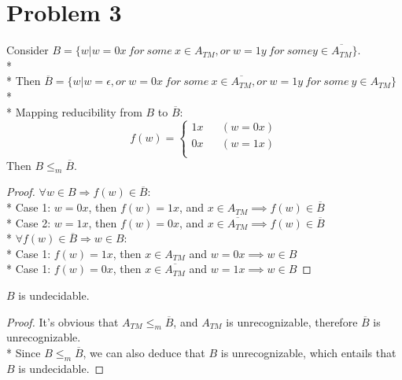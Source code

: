 \documentclass{article}
\begin{document}
    \section*{Problem 3}
    Consider $B=\{w|w=0x\ for\ some\ x \in A_{TM}, or\ w=1y\ for\ some y \in \overline{A_{TM}}\}$.\\*\\*
    Then $\overline{B}=\{ w|w=\epsilon,or\ w=0x\ for\ some\ x \in \overline{A_{TM}}, or\ w=1y\ for\ some\ y \in A_{TM}\}$\\*\\*
    Mapping reducibility from $B$ to $\overline{B}$:
    $$ f(w)=\left\{
        \begin{aligned}
        1x &  & (w=0x) \\
        0x &  & (w=1x) \\
        \end{aligned}
        \right. $$
    Then $B\leq_m \overline{B}$.
    \begin{proof}
        $\forall w \in B \Rightarrow f(w) \in \overline{B}$:\\*
        Case 1: $w=0x$, then $f(w)=1x$, and $x\in A_{TM} \implies f(w) \in \overline{B}$\\*
        Case 2: $w=1x$, then $f(w)=0x$, and $x\in \overline{A_{TM}} \implies f(w) \in \overline{B}$\\*
        $\forall f(w) \in \overline{B} \Rightarrow w \in B$:\\*
        Case 1: $f(w)=1x$, then $x \in A_{TM}$ and $w=0x \implies w \in B$\\*
        Case 1: $f(w)=0x$, then $x \in \overline{A_{TM}}$ and $w=1x \implies w \in B$
    \end{proof}
    $B$ is undecidable.
    \begin{proof}
        It's obvious that $A_{TM} \leq_m \overline{B}$, and $A_{TM}$ is unrecognizable, therefore $\overline{B}$ is unrecognizable.\\*
        Since $B\leq_m \overline{B}$, we can also deduce that $B$ is unrecognizable, which entails that $B$ is undecidable.
    \end{proof}
 
\end{document}

